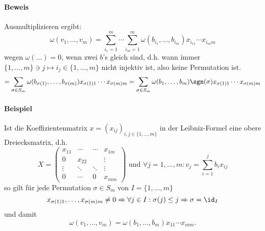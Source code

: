 \paragraph{Beweis}
	Ausmultiplizieren ergibt:
		\[ \omega(v_1,\dots,v_m)=\sum_{i_1=1}^{m}\cdots \sum_{i_m=1}^{m}\omega(b_{i_1},\dots,b_{i_m})x_{i_11}\cdots x_{i_mm} \]
	wegen $ \omega(\dots)=0 $, wenn zwei $ b $'s gleich sind, d.h. wann immer $ \{1,\dots,m \}\ni j\mapsto i_j \in \{1,\dots,m\} $ nicht injektiv ist, also keine Permutation ist.
		\[ = \sum_{\sigma\in S_m}\omega(b_{\sigma(1)},\dots,b_{\sigma(m)})x_{\sigma(1)1}\cdots x_{\sigma(m)m} = \sum_{\sigma\in S_m}\omega(b_1,\dots,b_m)\sgn(\sigma)x_{\sigma(1)1}\cdots x_{\sigma(m)m}\]
\paragraph{Beispiel}
	Ist die Koeffizientenmatrix $ x=(x_{ij})_{i,j\in\{1,\dots,m\}} $ in der Leibniz-Formel eine obere Dreiecksmatrix, d.h.
		\[ X= \begin{pmatrix}
		x_{11} & \cdots & \cdots & x_{1m}\\
		0 & x_{22} & &\vdots\\
		\vdots & \ddots & \ddots &\vdots\\
		0 & \cdots & 0 & x_{mm}
		\end{pmatrix}
		\text{ und } \forall j=1,\dots,m :v_j=\sum_{i=1}^{j}b_ix_{ij} \]
	so gilt für jede Permutation $ \sigma\in S_m $ von $ I=\{1,\dots,m \} $
		\[ x_{\sigma(1)1},\dots,x_{\sigma(m)m}\neq 0 \Rightarrow \forall j\in I:\sigma(j)\leq j \Rightarrow \sigma = \id_I \]
	und damit 
		\[ \omega(v_1,\dots,v_m) = \omega(b_1,\dots,b_m) x_{11}\cdots x_{mm}. \]
